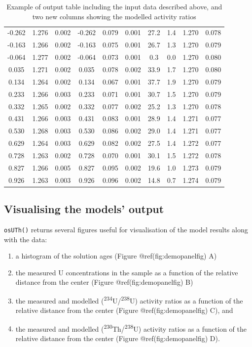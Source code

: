 \documentclass[]{elsarticle} %
\providecommand{\tightlist}{%
  \setlength{\itemsep}{0pt}\setlength{\parskip}{0pt}}
\begin{document}
\begin{table}[ht]
\begin{tabular}{cccccccccc}
  -0.262 & 1.276 & 0.002 & -0.262 & 0.079 & 0.001 & 27.2 & 1.4 & 1.270 & 0.078 \\ 
  -0.163 & 1.266 & 0.002 & -0.163 & 0.075 & 0.001 & 26.7 & 1.3 & 1.270 & 0.079 \\ 
  -0.064 & 1.277 & 0.002 & -0.064 & 0.073 & 0.001 & 0.3 & 0.0 & 1.270 & 0.080 \\ 
  0.035 & 1.271 & 0.002 & 0.035 & 0.078 & 0.002 & 33.9 & 1.7 & 1.270 & 0.080 \\ 
  0.134 & 1.264 & 0.002 & 0.134 & 0.067 & 0.001 & 37.7 & 1.9 & 1.270 & 0.079 \\ 
  0.233 & 1.266 & 0.003 & 0.233 & 0.071 & 0.001 & 30.7 & 1.5 & 1.270 & 0.079 \\ 
  0.332 & 1.265 & 0.002 & 0.332 & 0.077 & 0.002 & 25.2 & 1.3 & 1.270 & 0.078 \\ 
  0.431 & 1.266 & 0.003 & 0.431 & 0.083 & 0.001 & 28.9 & 1.4 & 1.271 & 0.077 \\ 
  0.530 & 1.268 & 0.003 & 0.530 & 0.086 & 0.002 & 29.0 & 1.4 & 1.271 & 0.077 \\ 
  0.629 & 1.264 & 0.003 & 0.629 & 0.082 & 0.002 & 27.5 & 1.4 & 1.272 & 0.077 \\ 
  0.728 & 1.263 & 0.002 & 0.728 & 0.070 & 0.001 & 30.1 & 1.5 & 1.272 & 0.078 \\ 
  0.827 & 1.266 & 0.005 & 0.827 & 0.095 & 0.002 & 19.6 & 1.0 & 1.273 & 0.079 \\ 
  0.926 & 1.263 & 0.003 & 0.926 & 0.096 & 0.002 & 14.8 & 0.7 & 1.274 & 0.079 \\ 
   \hline
\end{tabular}
\caption{\label{tab:outputdata}Example of output table including the input data described above, and two new columns showing the modelled activity ratios} 
\end{table}

\hypertarget{visualising-the-models-output}{%
\subsection{Visualising the models' output}\label{visualising-the-models-output}}

\texttt{osUTh()} returns several figures useful for visualisation of the model results along with the data:

\begin{enumerate}
\def\labelenumi{\arabic{enumi}.}
\tightlist
\item
  a histogram of the solution ages (Figure @ref(fig:demopanelfig) A)
\item
  the measured U concentrations in the sample as a function of the relative distance from the center (Figure @ref(fig:demopanelfig) B)
\item
  the measured and modelled (\textsuperscript{234}U/\textsuperscript{238}U) activity ratios as a function of the relative distance from the center (Figure @ref(fig:demopanelfig) C), and
\item
  the measured and modelled (\textsuperscript{230}Th/\textsuperscript{238}U) activity ratios as a function of the relative distance from the center (Figure @ref(fig:demopanelfig) D).
\end{enumerate}
\end{document}
